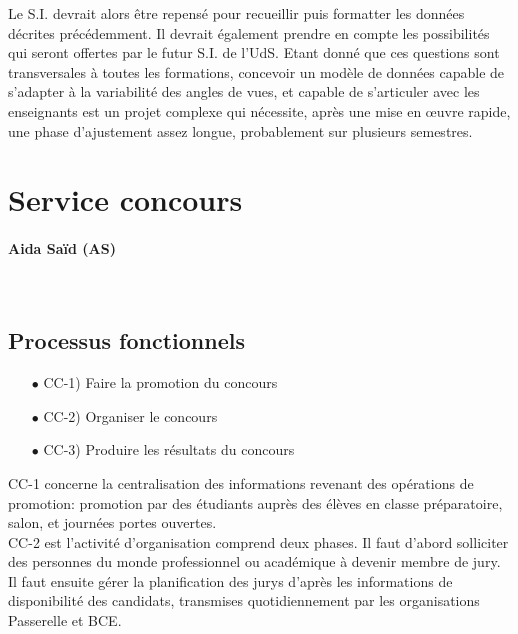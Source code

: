 \documentclass{book}
\begin{document}
Le S.I. devrait alors être repensé pour recueillir puis formatter les 
données décrites précédemment. Il devrait également prendre en compte 
les possibilités qui seront offertes par le futur S.I.  
de l'UdS. Etant donné que ces questions sont transversales à toutes les 
formations, concevoir un modèle de données capable de s'adapter à la 
variabilité des angles de vues, et capable de s'articuler avec les 
enseignants est un projet complexe qui nécessite, après une mise en 
{\oe}uvre rapide, une phase d'ajustement assez longue, probablement sur
plusieurs semestres. 





\section{Service concours }
\paragraph{Aida Saïd (AS)}
~\\

\subsection{Processus fonctionnels}
\label{sc:concours-process}

\begin{itemize}
\item[$\bullet$] CC-1) Faire la promotion du concours
\item[$\bullet$] CC-2) Organiser le concours
\item[$\bullet$] CC-3) Produire les résultats du concours
\end{itemize}
\bigskip

CC-1 concerne la centralisation des informations revenant des
opérations de promotion: promotion par des étudiants auprès  des 
élèves en classe préparatoire, salon, et journées portes 
ouvertes.\\ 

CC-2 est l'activité d'organisation comprend deux phases. Il 
faut d'abord solliciter des personnes du monde professionnel 
ou académique à devenir membre de jury. Il faut ensuite gérer
la planification des jurys d'après les informations de
disponibilité des candidats, transmises quotidiennement
par les organisations Passerelle et BCE.\\
\end{document}
